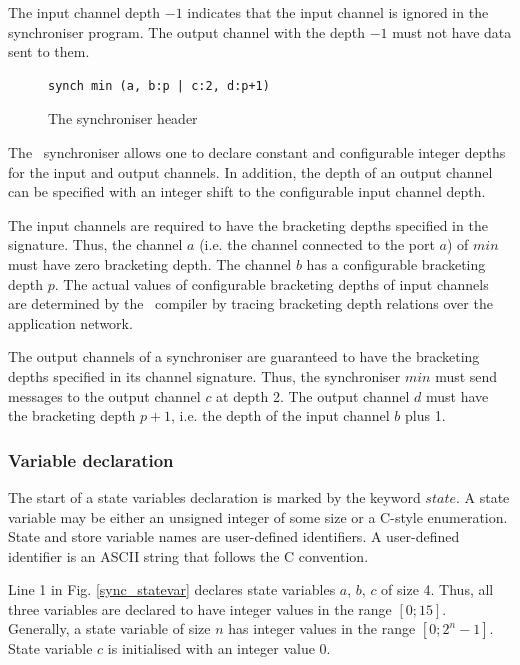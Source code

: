 The input channel depth $-1$ indicates that the input channel is ignored in the synchroniser program. The output channel with the depth $-1$ must not have data sent to them.

\begin{figure}[h!]
\begin{lstlisting}[frame=single]
synch min (a, b:p | c:2, d:p+1)
\end{lstlisting}
\caption{The synchroniser header}
\label{min_sync_head}
\end{figure}


The \ak\ synchroniser allows one to declare constant and configurable integer depths for the input and output channels. In addition, the depth of an output channel can be specified with an integer shift to the configurable input channel depth.

The input channels are required to have the bracketing depths specified in the signature. Thus, the channel $a$ (i.e. the channel connected to the port $a$) of $min$ must have zero bracketing depth. The channel $b$ has a configurable bracketing depth $p$. The actual values of configurable bracketing depths of input channels are determined by the \ak\ compiler by tracing bracketing depth relations over the application network.

The output channels of a synchroniser are guaranteed to have the bracketing depths specified in its channel signature. Thus, the synchroniser $min$ must send messages to the output channel $c$ at depth 2. The output channel $d$ must have the bracketing depth $p+1$, i.e. the depth of the input channel $b$ plus 1.


  \subsubsection*{Variable declaration}
The start of a state variables declaration is marked by the keyword $state$. A state variable may be either an unsigned integer of some size or a C-style enumeration. State and store variable names are user-defined identifiers. A user-defined identifier is an ASCII string that follows the C convention.

Line 1 in Fig. \ref{sync_statevar} declares state variables $a$, $b$, $c$ of size 4. Thus, all three variables are declared to have integer values in the range $[0; 15]$. Generally, a state variable of size $n$ has integer values in the range $[0; 2^{n}-1]$. State variable $c$ is initialised with an integer value 0.

